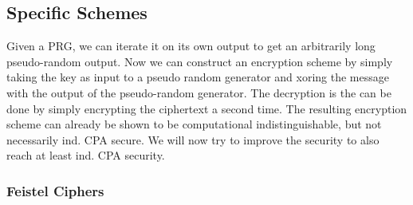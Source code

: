 \subsection{Specific Schemes}

Given a PRG, we can iterate it on its own output to get an arbitrarily long pseudo-random output. Now we can construct an encryption scheme by simply taking the key as input to a pseudo random generator and xoring the message with the output of the pseudo-random generator. The decryption is the can be done by simply encrypting the ciphertext a second time. The resulting encryption scheme can already be shown to be computational indistinguishable, but not necessarily ind. CPA secure. We will now try to improve the security to also reach at least ind. CPA security. 

\subsubsection{Feistel Ciphers}

